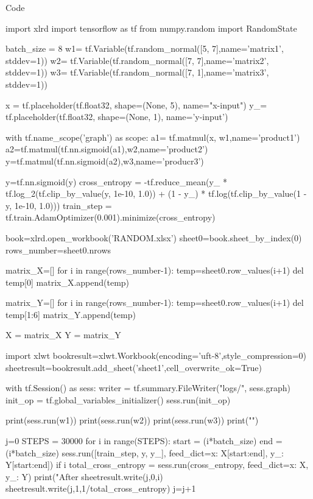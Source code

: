 \documentclass{article}
\begin{document}
\begin{spacing}{2}
    \begin{center}
        Code
    \end{center}
\begin{python}
import xlrd
import tensorflow as tf
from numpy.random import RandomState

batch_size = 8
w1= tf.Variable(tf.random_normal([5, 7],name='matrix1', stddev=1))
w2= tf.Variable(tf.random_normal([7, 7],name='matrix2', stddev=1))
w3= tf.Variable(tf.random_normal([7, 1],name='matrix3', stddev=1))
        
x = tf.placeholder(tf.float32, shape=(None, 5), name="x-input")
y_= tf.placeholder(tf.float32, shape=(None, 1), name='y-input')

with tf.name_scope('graph') as scope:
    a1= tf.matmul(x, w1,name='product1')
    a2=tf.matmul(tf.nn.sigmoid(a1),w2,name='product2')
    y=tf.matmul(tf.nn.sigmoid(a2),w3,name='producr3')

    y=tf.nn.sigmoid(y)
    cross_entropy = -tf.reduce_mean(y_ * tf.log_2(tf.clip_by_value(y, 1e-10, 1.0))
    + (1 - y_) * tf.log(tf.clip_by_value(1 - y, 1e-10, 1.0)))
    train_step = tf.train.AdamOptimizer(0.001).minimize(cross_entropy)

book=xlrd.open_workbook('RANDOM.xlsx')
sheet0=book.sheet_by_index(0)
rows_number=sheet0.nrows

matrix_X=[]
for i in range(rows_number-1):
    temp=sheet0.row_values(i+1)
    del temp[0]
    matrix_X.append(temp)

matrix_Y=[]
for i in range(rows_number-1):
    temp=sheet0.row_values(i+1)
    del temp[1:6]
    matrix_Y.append(temp)

X = matrix_X
Y = matrix_Y

import xlwt
bookresult=xlwt.Workbook(encoding='uft-8',style_compression=0)
sheetresult=bookresult.add_sheet('sheet1',cell_overwrite_ok=True)

with tf.Session() as sess:
    writer = tf.summary.FileWriter("logs/", sess.graph)
    init_op = tf.global_variables_initializer()
    sess.run(init_op)
    
    print(sess.run(w1))
    print(sess.run(w2))
    print(sess.run(w3))   
    print("\n")
    
    j=0
    STEPS = 30000
    for i in range(STEPS):
        start = (i*batch_size) %
        end = (i*batch_size) %
        sess.run([train_step, y, y_], feed_dict={x: X[start:end], y_: Y[start:end]})
        if i %
            total_cross_entropy = sess.run(cross_entropy, feed_dict={x: X, y_: Y})
            print("After %
            sheetresult.write(j,0,i)
            sheetresult.write(j,1,1/total_cross_entropy)
            j=j+1


\end{python}
\end{spacing}
\end{document}
